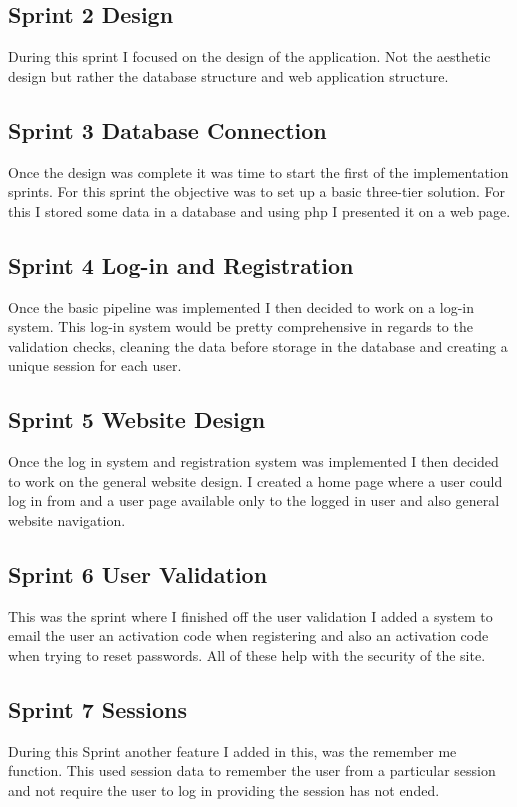 \subsection{Sprint 2 Design}
During this sprint I focused on the design of the application. Not the aesthetic design but rather the database structure and web application structure.

\subsection{Sprint 3 Database Connection}
Once the design was complete it was time to start the first of the implementation sprints. For this sprint the objective was to set up a basic three-tier solution. For this I stored some data in a database and using php I presented it on a web page. 

\subsection{Sprint 4 Log-in and Registration}
Once the basic pipeline was implemented I then decided to work on a log-in system. This log-in system would be pretty comprehensive in regards to the validation checks, cleaning the data before storage in the database and creating a unique session for each user. 

\subsection{Sprint 5 Website Design}
Once the log in system and registration system was implemented I then decided to work on the general website design. I created a home page where a user could log in from and a user page available only to the logged in user and also general website navigation.

\subsection{Sprint 6 User Validation}
This was the sprint where I finished off the user validation I added a system to email the user an activation code when registering and also an activation code when trying to reset passwords. All of these help with the security of the site.

\subsection{Sprint 7 Sessions}
During this Sprint another feature I added in this, was the remember me function. This used session data to remember the user from a particular session and not require the user to log in providing the session has not ended.
 
